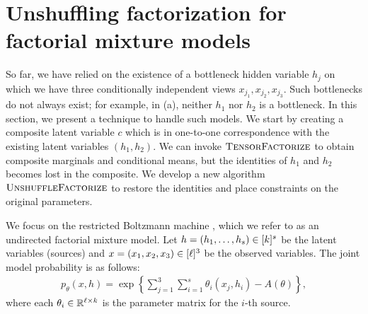 \section{Unshuffling factorization for factorial mixture models}
\label{sec:factorialModels}

So far, we have relied on the existence of a bottleneck hidden variable $h_j$ on which
we have three conditionally independent views $x_{j_1},x_{j_2},x_{j_3}$.  Such bottlenecks do not always
exist; for example, in (a), neither $h_1$ nor $h_2$ is
a bottleneck.
In this section, we present a technique to handle such models.
We start by creating a composite latent variable $c$ which is in
one-to-one correspondence with the existing latent variables $(h_1,h_2)$.
We can invoke $\text{\sc TensorFactorize}$ to obtain composite marginals and
conditional means, but the identities of $h_1$ and $h_2$ becomes lost in the
composite.  We develop a new algorithm $\text{\sc UnshuffleFactorize}$
to restore the identities and place constraints on the original
parameters.


We focus on the restricted Boltzmann machine
\cite{smolensky86rbm,salakhutdinov09softmax},
which we refer to as an undirected factorial mixture model.
Let $h = (h_1, \dots, h_s) \in [k]^s$ be the latent variables (sources)
and $x = (x_1, x_2, x_3) \in [\ell]^3$ be the observed variables.
The joint model probability is as follows:
\begin{align}
p_\theta(x, h) = \exp \left\{ \sum_{j=1}^3 \sum_{i=1}^s \theta_i(x_j, h_i) - A(\theta) \right\},
\end{align}
where each $\theta_i \in \mathbb{R}^{\ell \times k}$ is the parameter matrix for the $i$-th source.

